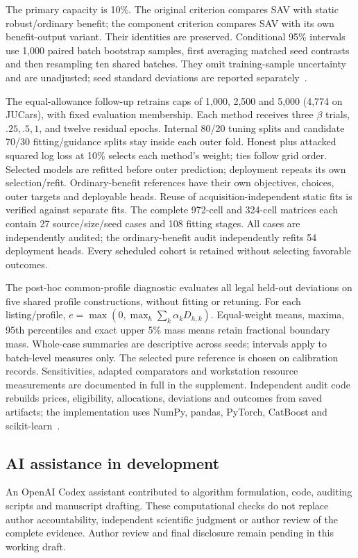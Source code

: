 \documentclass[pdflatex,sn-nature]{sn-jnl}
\begin{document}
The primary capacity is 10\%. The original criterion compares SAV with
static robust/ordinary benefit; the component criterion compares SAV with
its own benefit-output variant. Their identities are preserved. Conditional
95\% intervals use 1,000 paired batch bootstrap samples, first averaging
matched seed contrasts and then resampling ten shared batches. They omit
training-sample uncertainty and are unadjusted; seed standard deviations
are reported separately~\cite{efron1979bootstrap,cameron2015clusters}.

The equal-allowance follow-up retrains caps of 1,000, 2,500 and 5,000
(4,774 on JUCars), with fixed evaluation membership. Each method receives
three $\beta$ trials, $.25,.5,1$, and twelve residual epochs. Internal
80/20 tuning splits and candidate 70/30 fitting/guidance splits stay inside
each outer fold. Honest plus attacked squared log loss at 10\% selects
each method's weight; ties follow grid order. Selected models are refitted
before outer prediction; deployment repeats its own selection/refit.
Ordinary-benefit references have their own objectives, choices, outer targets
and deployable heads. Reuse of acquisition-independent static fits is verified
against separate fits. The complete 972-cell and 324-cell matrices each
contain 27 source/size/seed cases and 108 fitting stages. All cases are
independently audited; the ordinary-benefit audit independently refits 54
deployment heads. Every scheduled cohort is retained without selecting
favorable outcomes.

The post-hoc common-profile diagnostic evaluates all legal held-out deviations
on five shared profile constructions, without fitting or retuning. For each
listing/profile, $e=\max(0,\max_h\sum_k\alpha_kD_{h,k})$. Equal-weight means,
maxima, 95th percentiles and exact upper 5\% mass means retain fractional
boundary mass. Whole-case summaries are descriptive across seeds; intervals
apply to batch-level measures only. The selected pure reference is chosen
on calibration records. Sensitivities, adapted comparators and workstation
resource measurements are documented in full in the supplement. Independent
audit code rebuilds prices, eligibility, allocations, deviations and outcomes
from saved artifacts; the implementation uses NumPy, pandas, PyTorch,
CatBoost and scikit-learn~\cite{pedregosa2011sklearn}.

\subsection{AI assistance in development}
An OpenAI Codex assistant contributed to algorithm formulation, code, auditing
scripts and manuscript drafting. These computational checks do not replace
author accountability, independent scientific judgment or author review of
the complete evidence. Author review and final disclosure remain pending in
this working draft.
\end{document}
